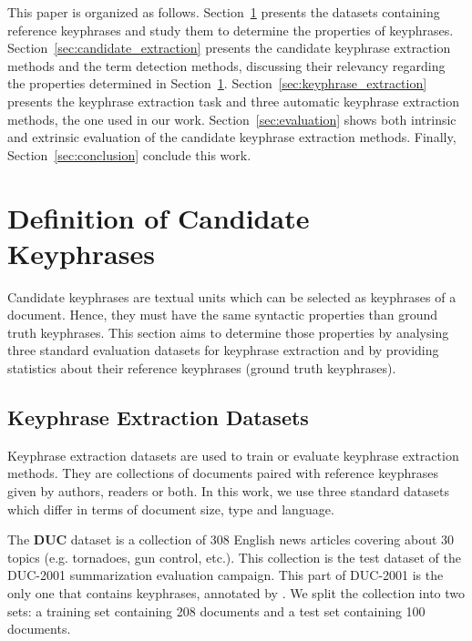   This paper is organized as follows.
  Section~\ref{sec:definition_of_candidate_keyphrases} presents the datasets
  containing reference keyphrases and study them to determine the properties of
  keyphrases. Section~\ref{sec:candidate_extraction} presents the candidate
  keyphrase extraction methods and the term detection methods, discussing their
  relevancy regarding the properties determined in
  Section~\ref{sec:definition_of_candidate_keyphrases}.
  Section~\ref{sec:keyphrase_extraction} presents the keyphrase extraction task
  and three automatic keyphrase extraction methods, the one used in our work.
  Section~\ref{sec:evaluation} shows both intrinsic and extrinsic evaluation of
  the candidate keyphrase extraction methods. Finally,
  Section~\ref{sec:conclusion} conclude this work.

\section{Definition of Candidate Keyphrases}
\label{sec:definition_of_candidate_keyphrases}
  Candidate keyphrases are textual units which can be selected as keyphrases
  of a document. Hence, they must have the same syntactic properties than ground
  truth keyphrases. This section aims to determine those properties by analysing
  three standard evaluation datasets for keyphrase extraction and by providing
  statistics about their reference keyphrases (ground truth keyphrases).

  \subsection{Keyphrase Extraction Datasets}
  \label{subsec:keyphrase_extraction_datasets}
    Keyphrase extraction datasets are used to train or evaluate keyphrase
    extraction methods. They are collections of documents paired with reference
    keyphrases given by authors, readers or both. In this work, we use three
    standard datasets which differ in terms of document size,  type and
    language.

    The \textbf{DUC} dataset \cite{over2001duc} is a collection of 308 English
    news articles covering about 30 topics (e.g. tornadoes, gun control, etc.).
    This collection is the test dataset of the DUC-2001 summarization evaluation
    campaign. This part of DUC-2001 is the only one that contains keyphrases,
    annotated by . We split the collection into two
    sets: a training set containing 208 documents and a test set containing 100
    documents.


